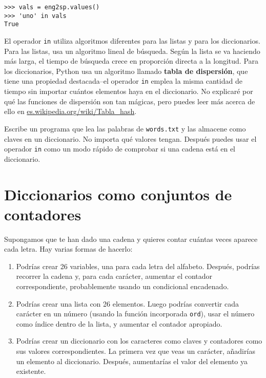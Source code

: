 
\beforeverb
\begin{verbatim}
>>> vals = eng2sp.values()
>>> 'uno' in vals
True
\end{verbatim}
\afterverb
%
El operador {\tt in} utiliza algoritmos diferentes para las listas y
para los diccionarios. Para las listas, usa un algoritmo lineal de búsqueda.
Según la lista se va haciendo más larga, el tiempo de búsqueda
crece en proporción directa a la longitud.
Para los diccionarios, Python usa un
algoritmo llamado {\bf tabla de dispersión}, que tiene una propiedad destacada--el
operador {\tt in} emplea la misma cantidad de tiempo sin importar cuántos
elementos haya en el diccionario. No explicaré
por qué las funciones de dispersión son tan mágicas,
pero puedes leer más acerca de ello en
\url{es.wikipedia.org/wiki/Tabla_hash}.


\begin{ex}
\label{wordlist2}


Escribe un programa que lea las palabras de {\tt words.txt} y
las almacene como claves en un diccionario. No importa qué
valores tengan. Después puedes usar el operador {\tt in}
como un modo rápido de comprobar si una cadena está en el
diccionario.

\end{ex}


\section{Diccionarios como conjuntos de contadores}
\label{histogram}


Supongamos que te han dado una cadena y quieres contar cuántas veces
aparece cada letra. Hay varias formas de hacerlo:

\begin{enumerate}

\item Podrías crear 26 variables, una para cada letra del
alfabeto. Después, podrías recorrer la cadena y, para cada
carácter, aumentar el contador correspondiente, probablemente
usando un condicional encadenado.

\item Podrías crear una lista con 26 elementos. Luego podrías
convertir cada carácter en un número (usando la función incorporada
{\tt ord}), usar el número como índice dentro de la lista, y aumentar
el contador apropiado.

\item Podrías crear un diccionario con los caracteres como claves
y contadores como sus valores correspondientes. La primera vez
que veas un carácter, añadirías un elemento al diccionario.
Después, aumentarías el valor del elemento ya existente.

\end{enumerate}

